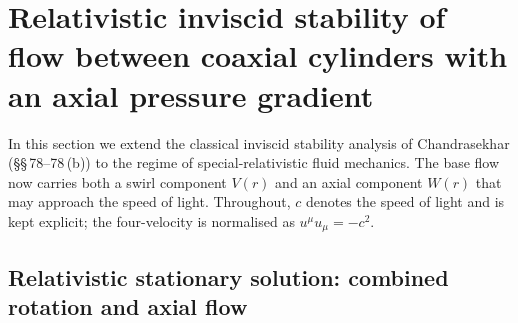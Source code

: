 %

\section{Relativistic inviscid stability of flow between coaxial cylinders
         with an axial pressure gradient}
\label{sec:rel-8-79}

In this section we extend the classical inviscid stability analysis of
Chandrasekhar (\S\S\,78--78\,(b)) to the regime of special-relativistic
fluid mechanics.  The base flow now carries both a swirl component
$V(r)$ and an axial component $W(r)$ that may approach the speed of
light.  Throughout, $c$ denotes the speed of light and is kept
explicit; the four-velocity is normalised as $u^{\mu}u_{\mu}=-c^{2}$.

\subsection{Relativistic stationary solution: combined rotation and
            axial flow}
\label{sec:rel-8-79a}

